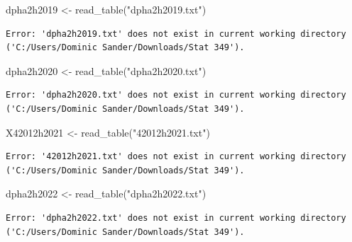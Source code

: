 \documentclass[
  letterpaper,
  DIV=11,
  numbers=noendperiod]{scrreprt}
\newenvironment{Shaded}{\begin{snugshade}}{\end{snugshade}}
\newcommand{\FunctionTok}[1]{\textcolor[rgb]{0.28,0.35,0.67}{#1}}
\newcommand{\NormalTok}[1]{\textcolor[rgb]{0.00,0.23,0.31}{#1}}
\newcommand{\OtherTok}[1]{\textcolor[rgb]{0.00,0.23,0.31}{#1}}
\newcommand{\StringTok}[1]{\textcolor[rgb]{0.13,0.47,0.30}{#1}}
\begin{document}
\begin{Shaded}
\begin{Highlighting}[]
\NormalTok{dpha2h2019 }\OtherTok{\textless{}{-}} \FunctionTok{read\_table}\NormalTok{(}\StringTok{"dpha2h2019.txt"}\NormalTok{)}
\end{Highlighting}
\end{Shaded}

\begin{verbatim}
Error: 'dpha2h2019.txt' does not exist in current working directory ('C:/Users/Dominic Sander/Downloads/Stat 349').
\end{verbatim}

\begin{Shaded}
\begin{Highlighting}[]
\NormalTok{dpha2h2020 }\OtherTok{\textless{}{-}} \FunctionTok{read\_table}\NormalTok{(}\StringTok{"dpha2h2020.txt"}\NormalTok{)}
\end{Highlighting}
\end{Shaded}

\begin{verbatim}
Error: 'dpha2h2020.txt' does not exist in current working directory ('C:/Users/Dominic Sander/Downloads/Stat 349').
\end{verbatim}

\begin{Shaded}
\begin{Highlighting}[]
\NormalTok{X42012h2021 }\OtherTok{\textless{}{-}} \FunctionTok{read\_table}\NormalTok{(}\StringTok{"42012h2021.txt"}\NormalTok{)}
\end{Highlighting}
\end{Shaded}

\begin{verbatim}
Error: '42012h2021.txt' does not exist in current working directory ('C:/Users/Dominic Sander/Downloads/Stat 349').
\end{verbatim}

\begin{Shaded}
\begin{Highlighting}[]
\NormalTok{dpha2h2022 }\OtherTok{\textless{}{-}} \FunctionTok{read\_table}\NormalTok{(}\StringTok{"dpha2h2022.txt"}\NormalTok{)}
\end{Highlighting}
\end{Shaded}

\begin{verbatim}
Error: 'dpha2h2022.txt' does not exist in current working directory ('C:/Users/Dominic Sander/Downloads/Stat 349').
\end{verbatim}
\end{document}
